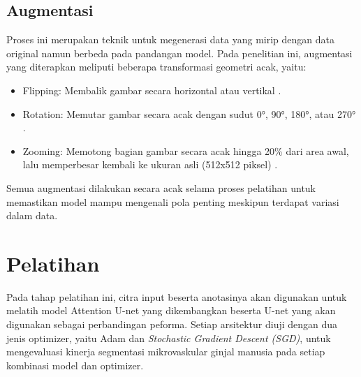 \subsection{Augmentasi}

\noindent Proses ini merupakan teknik untuk megenerasi  data yang mirip dengan data original namun berbeda pada pandangan model. Pada penelitian ini, augmentasi yang diterapkan meliputi beberapa transformasi geometri acak, yaitu:
\begin{itemize}
	\item Flipping: Membalik gambar secara horizontal atau vertikal \cite{goceri_medical_2023,hu_multi-scale_2023,oktay_attention_2018}.
	\item Rotation: Memutar gambar secara acak dengan sudut 0°, 90°, 180°, atau 270° \cite{goceri_medical_2023,ronneberger_u-net_2015}.
	\item Zooming: Memotong bagian gambar secara acak hingga 20\% dari area awal, lalu memperbesar kembali ke ukuran asli (512x512 piksel) \cite{goceri_medical_2023,oktay_attention_2018}.
\end{itemize}

\noindent Semua augmentasi dilakukan secara acak selama proses pelatihan untuk memastikan model mampu mengenali pola penting meskipun terdapat variasi dalam data.





\section{Pelatihan}
\noindent Pada tahap pelatihan ini, citra input beserta anotasinya akan digunakan untuk melatih model Attention U-net yang dikembangkan beserta U-net yang akan digunakan sebagai perbandingan peforma. Setiap arsitektur diuji dengan dua jenis optimizer, yaitu Adam dan \textit{Stochastic Gradient Descent (SGD)}, untuk mengevaluasi kinerja segmentasi mikrovaskular ginjal manusia pada setiap kombinasi model dan optimizer.

